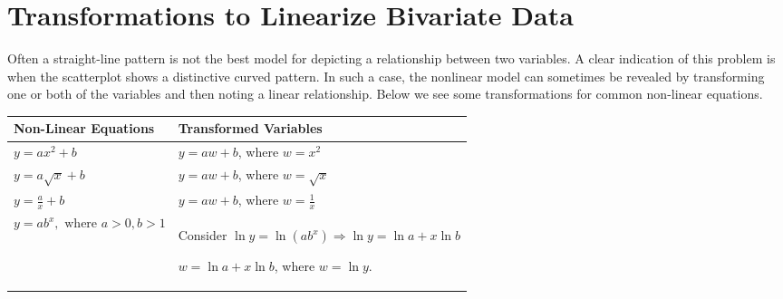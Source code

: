 \documentclass[11pt,a4paper]{book}
\begin{document}
\newpage{}

\section{Transformations to Linearize Bivariate Data}

Often a straight-line pattern is not the best model for depicting
a relationship between two variables. A clear indication of this problem
is when the scatterplot shows a distinctive curved pattern. In such
a case, the nonlinear model can sometimes be revealed by transforming
one or both of the variables and then noting a linear relationship.
Below we see some transformations for common non-linear equations.
\begin{center}
\setlength{\extrarowheight}{2pt}%
\begin{tabular}{|>{\centering}m{6cm}|>{\centering}m{8cm}|}
\hline
\medskip

Non-Linear Equations

\smallskip & \medskip

Transformed Variables

\smallskip\tabularnewline
\hline
\smallskip

$y=ax^{2}+b$

\smallskip & \smallskip

$y=aw+b$, where $w=x^{2}$

\smallskip\tabularnewline
\hline
\smallskip

$y=a\sqrt{x}+b$

\smallskip & \smallskip

$y=aw+b$, where $w=\sqrt{x}$

\smallskip\tabularnewline
\hline
\smallskip

${\displaystyle y=\frac{a}{x}+b}$

\smallskip & \smallskip

$y=aw+b$, where ${\displaystyle w=\frac{1}{x}}$

\smallskip\tabularnewline
\hline
\smallskip

$y=ab^{x},\text{ where }a>0,b>1$

\smallskip & Consider $\ln y=\ln\left(ab^{x}\right)\Rightarrow\ln y=\ln a+x\ln b$

$w=\ln a+x\ln b$, where $w=\ln y$.\tabularnewline
\hline
\end{tabular}
\par\end{center}
\end{document}
